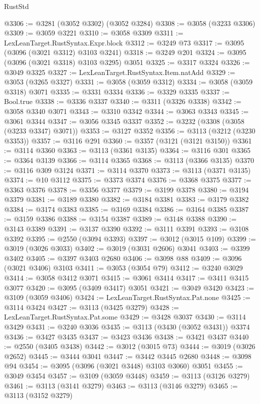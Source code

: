 \begin{lexlean}{RustStd}
\begin{coremodule}
{\begin{coremodule}
{{{{{{{{{{{{{{{{{{{{{{{{{{{{{{{{@3306 := @3281 (@3052 @3302) (@3052 @3284)
@3308 := @3058 (@3233 @3306)
@3309 := @3059 @3221
@3310 := @3058 @3309
@3311 := LexLeanTarget.RustSyntax.Expr.block
@3312 := @3249 @73
@3317 := @3095 (@3096 (@3021 @3312) @3103 @3241)
@3318 := @3249 @201
@3324 := @3095 (@3096 (@3021 @3318) @3103 @3295) @3051
@3325 := @3317 @3324
@3326 := @3049 @3325
@3327 := LexLeanTarget.RustSyntax.Item.natAdd
@3329 := @3053 (@3265 @3327)
@3331 := @3058 (@3059 @3312)
@3334 := @3058 (@3059 @3318) @3071
@3335 := @3331 @3334
@3336 := @3329 @3335
@3337 := Bool.true
@3338 := @3336 @3337
@3340 := @3311 (@3326 @3338)
@3342 := @3058 @3340 @3071
@3343 := @3310 @3342
@3344 := @3063 @3343
@3345 := @3061 @3344
@3347 := @3056 @3345 @3337
@3352 := @3232 (@3308 (@3058 (@3233 @3347) @3071))
@3353 := @3127 @3352
@3356 := @3113 (@3212 (@3230 @3353))
@3357 := @3116 @291
@3360 := @3357 (@3121 (@3121 @3150))
@3361 := @3114 @3360
@3363 := @3113 (@3361 @3135)
@3364 := @3116 @301
@3365 := @3364 @3139
@3366 := @3114 @3365
@3368 := @3113 (@3366 @3135)
@3370 := @3116 @309 @3124
@3371 := @3114 @3370
@3373 := @3113 (@3371 @3135)
@3374 := @10 @3112
@3375 := @3373 @3374
@3376 := @3368 @3375
@3377 := @3363 @3376
@3378 := @3356 @3377
@3379 := @3199 @3378
@3380 := @3194 @3379
@3381 := @3189 @3380
@3382 := @3184 @3381
@3383 := @3179 @3382
@3384 := @3174 @3383
@3385 := @3169 @3384
@3386 := @3164 @3385
@3387 := @3159 @3386
@3388 := @3154 @3387
@3389 := @3148 @3388
@3390 := @3143 @3389
@3391 := @3137 @3390
@3392 := @3111 @3391
@3393 := @3108 @3392
@3395 := @2550 (@3094 @3393)
@3397 := @3012 (@3015 @109)
@3399 := @3019 (@3026 @3033)
@3402 := @3019 (@3031 @2606) @3041
@3403 := @3399 @3402
@3405 := @3397 @3403 @2680
@3406 := @3098 @88
@3409 := @3096 (@3021 @3406) @3103
@3411 := @3053 (@3054 @79)
@3412 := @3240 @3029
@3414 := @3058 @3412 @3071
@3415 := @3061 @3414
@3417 := @3411 @3415 @3077
@3420 := @3095 (@3409 @3417) @3051
@3421 := @3049 @3420
@3423 := @3109 (@3059 @3406)
@3424 := LexLeanTarget.RustSyntax.Pat.none
@3425 := @3114 @3424
@3427 := @3113 (@3425 @3279)
@3428 := LexLeanTarget.RustSyntax.Pat.some
@3429 := @3428 @3037
@3430 := @3114 @3429
@3431 := @3240 @3036
@3435 := @3113 (@3430 (@3052 @3431)) @3374
@3436 := @3427 @3435
@3437 := @3423 @3436
@3438 := @3421 @3437
@3440 := @2550 (@3405 @3438)
@3442 := @3012 (@3015 @73)
@3444 := @3019 (@3026 @2652)
@3445 := @3444 @3041
@3447 := @3442 @3445 @2680
@3448 := @3098 @94
@3454 := @3095 (@3096 (@3021 @3448) @3103 @3060) @3051
@3455 := @3049 @3454
@3457 := @3109 (@3059 @3448)
@3459 := @3113 (@3126 @3279)
@3461 := @3113 (@3141 @3279)
@3463 := @3113 (@3146 @3279)
@3465 := @3113 (@3152 @3279)
}}}}}}}}}}}}}}}}}}}}}}}}}}}}}}}}
\end{coremodule}}
\end{coremodule}
\end{lexlean}
